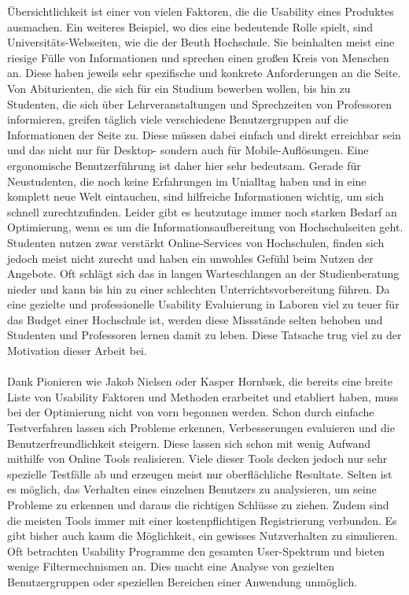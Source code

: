 Übersichtlichkeit ist einer von vielen Faktoren, die die Usability eines Produktes ausmachen. Ein weiteres Beispiel, wo dies eine bedeutende Rolle spielt, sind Universitäts-Webseiten, wie die der Beuth Hochschule. Sie beinhalten meist eine riesige Fülle von Informationen und sprechen einen großen Kreis von Menschen an. Diese haben jeweils sehr spezifische und konkrete Anforderungen an die Seite. Von Abiturienten, die sich für ein Studium bewerben wollen, bis hin zu Studenten, die sich über Lehrveranstaltungen und Sprechzeiten von Professoren informieren, greifen täglich viele verschiedene Benutzergruppen auf die Informationen der Seite zu. Diese müssen dabei einfach und direkt erreichbar sein und das nicht nur für Desktop- sondern auch für Mobile-Auflösungen. Eine ergonomische Benutzerführung ist daher hier sehr bedeutsam. Gerade für Neustudenten, die noch keine Erfahrungen im Unialltag haben und in eine komplett neue Welt eintauchen, sind hilfreiche Informationen wichtig, um sich schnell zurechtzufinden. Leider gibt es heutzutage immer noch starken Bedarf an Optimierung, wenn es um die Informationsaufbereitung von Hochschulseiten geht. Studenten nutzen zwar verstärkt Online-Services von Hochschulen, finden sich jedoch meist nicht zurecht und haben ein unwohles Gefühl beim Nutzen der Angebote. Oft schlägt sich das in langen Warteschlangen an der Studienberatung nieder und kann bis hin zu einer schlechten Unterrichtsvorbereitung führen. Da eine gezielte und professionelle Usability Evaluierung in Laboren viel zu teuer für das Budget einer Hochschule ist, werden diese Missstände selten behoben und Studenten und Professoren lernen damit zu leben. Diese Tatsache trug viel zu der Motivation dieser Arbeit bei.\\
\\
Dank Pionieren wie Jakob Nielsen oder Kasper Hornbæk, die bereits eine breite Liste von Usability Faktoren und Methoden erarbeitet und etabliert haben, muss bei der Optimierung nicht von vorn begonnen werden. Schon durch einfache Testverfahren lassen sich Probleme erkennen, Verbesserungen evaluieren und die Benutzerfreundlichkeit steigern. Diese lassen sich schon mit wenig Aufwand mithilfe von Online Tools realisieren. Viele dieser Tools decken jedoch nur sehr spezielle Testfälle ab und erzeugen meist nur oberflächliche Resultate. Selten ist es möglich, das Verhalten eines einzelnen Benutzers zu analysieren, um seine Probleme zu erkennen und daraus die richtigen Schlüsse zu ziehen. Zudem sind die meisten Tools immer mit einer kostenpflichtigen Registrierung verbunden. Es gibt bisher auch kaum die Möglichkeit, ein gewisses Nutzverhalten zu simulieren. Oft betrachten Usability Programme den gesamten User-Spektrum und bieten wenige Filtermechnismen an. Dies macht eine Analyse von gezielten Benutzergruppen oder speziellen Bereichen einer Anwendung unmöglich.\\

